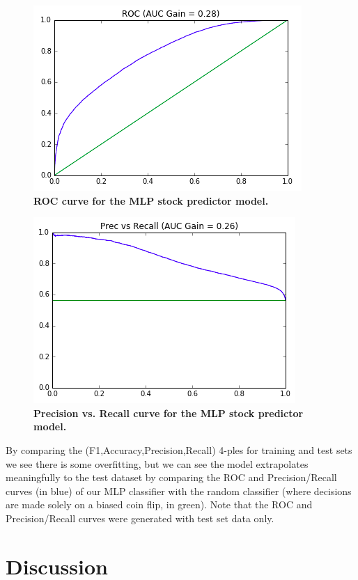 \documentclass{sig-alternate-05-2015}
\begin{document}
\begin{figure}[H]
	\centering\includegraphics[scale=0.6]{mlp1} 
	\caption{\textbf{ROC curve for the MLP stock predictor model.}}
\end{figure}

\begin{figure}[H]
	\centering\includegraphics[scale=0.6]{mlp2} 
	\caption{\textbf{Precision vs. Recall curve for the MLP stock predictor model.}}
\end{figure}

	
By comparing the (F1,Accuracy,Precision,Recall) 4-ples for training and test sets we see there is some overfitting, but we can see the model extrapolates meaningfully to the test dataset by comparing the ROC and Precision/Recall curves (in blue) of our MLP classifier with the random classifier (where decisions are made solely on a biased coin flip, in green).  Note that the ROC and Precision/Recall curves were generated with test set data only.


	\section{Discussion}
	
\end{document}
